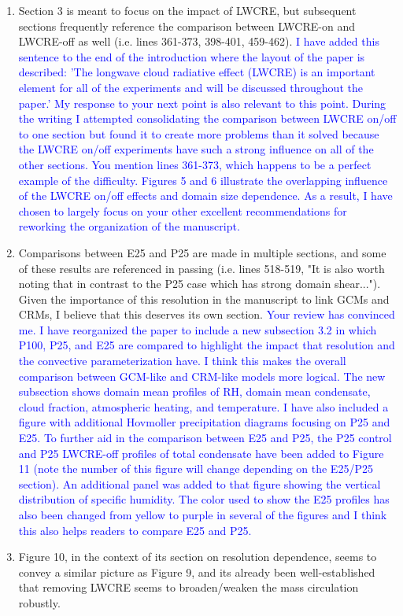 \documentclass[draft]{agujournal2019}
\begin{document}
\begin{enumerate}
  \item Section 3 is meant to focus on the impact of LWCRE, but subsequent sections frequently reference the comparison between LWCRE-on and LWCRE-off as well (i.e. lines 361-373, 398-401, 459-462).
  \textcolor{blue}{I have added this sentence to the end of the introduction where the layout of the paper is described: 'The longwave 
  cloud radiative effect (LWCRE) is an important element for all of the experiments and will be discussed throughout the paper.'  My 
  response to your next point is also relevant to this point.   During the writing I attempted consolidating the comparison between 
  LWCRE on/off to one section but found it to 
  create more problems than it solved because the LWCRE on/off experiments have such a strong influence on all of the other   
  sections.  You mention lines 361-373, which happens to be a perfect example of the difficulty.  Figures 5 and 6 illustrate the 
  overlapping influence of the LWCRE on/off effects and domain size dependence.  As a result, I have chosen to largely focus on your 
  other excellent recommendations for reworking the organization of the manuscript.}
  \item Comparisons between E25 and P25 are made in multiple sections, and some of these results are referenced in passing (i.e. lines 518-519, "It is also worth noting that in contrast to the P25 case which has strong domain shear..."). Given the importance of this resolution in the manuscript to link GCMs and CRMs, I believe that this deserves its own section.
  \textcolor{blue}{Your review has convinced me.  I have reorganized the paper to include a new subsection 3.2 in which P100, P25, and E25 are compared to highlight the impact that resolution and the convective parameterization have.  I think this makes the overall 
  comparison between GCM-like and CRM-like models more logical.   The new subsection shows domain mean profiles of RH, domain mean condensate, cloud fraction, atmospheric heating, and temperature.  I have also included a figure with additional Hovmoller precipitation diagrams focusing on P25 and E25. To further aid in the comparison between E25 and P25, the P25 control and P25 LWCRE-off profiles of total condensate have been added to Figure 11 (note the number of this figure will change depending on the E25/P25 section).  An additional panel was added to that figure showing the vertical distribution of specific humidity.  The color used to show the E25 profiles has also been changed from yellow to purple in several of the figures and I think this also helps readers to compare E25 and P25.}
  \item Figure 10, in the context of its section on resolution dependence, seems to convey a similar picture as Figure 9, and its already been well-established that removing LWCRE seems to broaden/weaken the mass circulation robustly.  
  

\end{enumerate}
\end{document}
